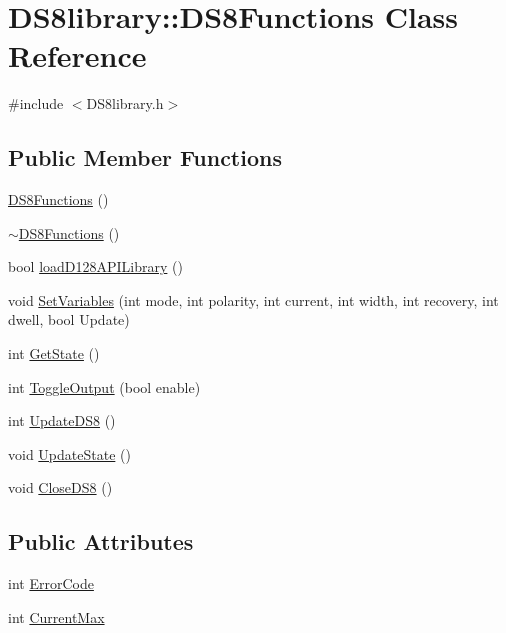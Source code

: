 \hypertarget{class_d_s8library_1_1_d_s8_functions}{}\section{D\+S8library\+:\+:D\+S8\+Functions Class Reference}
\label{class_d_s8library_1_1_d_s8_functions}


{\ttfamily \#include $<$D\+S8library.\+h$>$}

\subsection*{Public Member Functions}
\begin{DoxyCompactItemize}
\item 
\hyperlink{class_d_s8library_1_1_d_s8_functions_a888bb124e90722c5bbe9620cf983848d}{D\+S8\+Functions} ()
\item 
\hyperlink{class_d_s8library_1_1_d_s8_functions_a6a59ffea041221bababb0c8f58e065a3}{$\sim$\+D\+S8\+Functions} ()
\item 
bool \hyperlink{class_d_s8library_1_1_d_s8_functions_a018cdb5debaacff72ff3344c620821dd}{load\+D128\+A\+P\+I\+Library} ()
\item 
void \hyperlink{class_d_s8library_1_1_d_s8_functions_a40d9d40b7e8a437e4ceb54eb1aa80d48}{Set\+Variables} (int mode, int polarity, int current, int width, int recovery, int dwell, bool Update)
\item 
int \hyperlink{class_d_s8library_1_1_d_s8_functions_a2cd8259f9add8a4cd7f26942baef047a}{Get\+State} ()
\item 
int \hyperlink{class_d_s8library_1_1_d_s8_functions_a62ae825413cda1f339d17a9d0e50bd14}{Toggle\+Output} (bool enable)
\item 
int \hyperlink{class_d_s8library_1_1_d_s8_functions_a0e915e3a8b2dae57f07ce6a6642a026e}{Update\+D\+S8} ()
\item 
void \hyperlink{class_d_s8library_1_1_d_s8_functions_ad422873da361a8050340604eacd8a0ac}{Update\+State} ()
\item 
void \hyperlink{class_d_s8library_1_1_d_s8_functions_ae078feb572a174e1bddf5c5a44ed94fd}{Close\+D\+S8} ()
\end{DoxyCompactItemize}
\subsection*{Public Attributes}
\begin{DoxyCompactItemize}
\item 
int \hyperlink{class_d_s8library_1_1_d_s8_functions_a4b7ba83a45f157e158b462c82ecd559d}{Error\+Code}
\item 
int \hyperlink{class_d_s8library_1_1_d_s8_functions_a4b26efffe021c395bfc69b7d01d44edd}{Current\+Max}
\end{DoxyCompactItemize}


